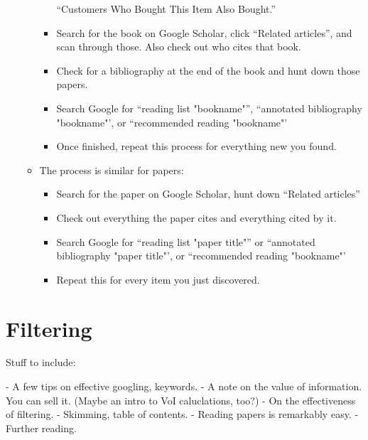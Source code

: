 \begin{enumerate}
\begin{itemize}
\begin{itemize}
      ``Customers Who Bought This Item Also Bought.''
    \item Search for the book on Google Scholar, click ``Related articles'', and
      scan through those. Also check out who cites that book.
    \item Check for a bibliography at the end of the book and hunt down those
      papers.
    \item Search Google for ``reading list "bookname"'', ``annotated
      bibliography "bookname"', or ``recommended reading "bookname"'
    \item Once finished, repeat this process for everything new you found.
    \end{itemize}
  \item The process is similar for papers:
    \begin{itemize}
    \item Search for the paper on Google Scholar, hunt down ``Related articles''
    \item Check out everything the paper cites and everything cited by it.
    \item Search Google for ``reading list "paper title"'' or ``annotated
      bibliography "paper title"', or ``recommended reading "bookname"'
    \item Repeat this for every item you just discovered.
    \end{itemize}
  \end{itemize}
\end{enumerate}

\section{Filtering}


Stuff to include:

- A few tips on effective googling, keywords.
- A note on the value of information. You can sell it. (Maybe an intro to VoI caluclations, too?)
- On the effectiveness of filtering. 
- Skimming, table of contents.
- Reading papers is remarkably easy.
- Further reading.
